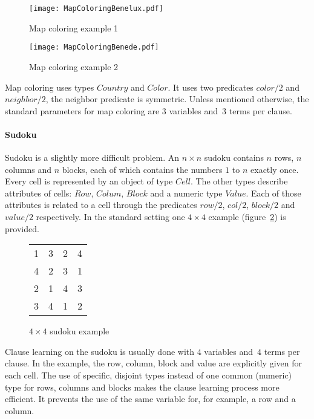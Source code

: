 \begin{figure}
\centering
\begin{minipage}{.5\textwidth}
  \centering
  \texttt{[image: MapColoringBenelux.pdf]}
  \caption{Map coloring example 1}
  \label{fig:setup_mapcolor_benelux}
\end{minipage}
\begin{minipage}{.5\textwidth}
  \centering
  \texttt{[image: MapColoringBenede.pdf]}
  \caption{Map coloring example 2}
  \label{fig:setup_mapcolor_benede}
\end{minipage}
\end{figure}

Map coloring uses types $\mathit{Country}$ and $\mathit{Color}$.
It uses two predicates $\mathit{color/2}$ and $\mathit{neighbor/2}$, the neighbor predicate is symmetric.
Unless mentioned otherwise, the standard parameters for map coloring are $3$ variables and~$3$ terms per clause.

\paragraph{Sudoku}
Sudoku is a slightly more difficult problem.
An $n \times n$ sudoku contains $n$ rows, $n$ columns and $n$ blocks, each of which contains the numbers $1$ to $n$ exactly once.
Every cell is represented by an object of type $\mathit{Cell}$.
The other types describe attributes of cells: $\mathit{Row}$, $\mathit{Colum}$, $\mathit{Block}$ and a numeric type $\mathit{Value}$.
Each of those attributes is related to a cell through the predicates $\mathit{row/2}$, $\mathit{col/2}$, $\mathit{block/2}$ and $\mathit{value/2}$ respectively.
In the standard setting one $4 \times 4$ example (figure~\ref{fig:setup_sudoku}) is provided.

\begin{figure}[!htp]
	\centering
	\begin{tabular}{|cc|cc|}
		\hline
		1 & 3 & 2 & 4 \\
		4 & 2 & 3 & 1 \\ \hline
		2 & 1 & 4 & 3 \\
		3 & 4 & 1 & 2 \\ \hline
	\end{tabular}
	\label{fig:setup_sudoku}
	\caption{$4 \times 4$ sudoku example}
\end{figure}

Clause learning on the sudoku is usually done with $4$ variables and~$4$ terms per clause.
In the example, the row, column, block and value are explicitly given for each cell.
The use of specific, disjoint types instead of one common (numeric) type for rows, columns and blocks makes the clause learning process more efficient.
It prevents the use of the same variable for, for example, a row and a column.

